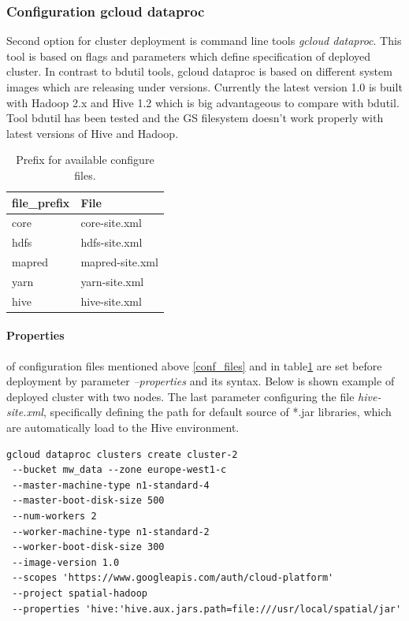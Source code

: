\documentclass[a4paper,12pt,oneside]{report}
\begin{document}
\subsubsection{Configuration gcloud dataproc}
Second option for cluster deployment is command line tools \textit{gcloud dataproc}. This tool is based on flags and parameters which define specification of deployed cluster. In contrast to bdutil tools, gcloud dataproc is based on different system images which are releasing under versions. Currently the latest version 1.0 is built with Hadoop 2.x and Hive 1.2 which is big advantageous to compare with bdutil. Tool bdutil has been tested and the GS filesystem doesn’t work properly with latest versions of Hive and Hadoop. 
\begin{table}[!htbp]
\centering
\begin{scriptsize}
\begin{tabular}{@{}|l|l|@{}}
\toprule 
file\_prefix & File            \\ \midrule \midrule
core         & core-site.xml   \\ \midrule
hdfs         & hdfs-site.xml   \\ \midrule
mapred       & mapred-site.xml \\ \midrule
yarn         & yarn-site.xml   \\ \midrule
hive         & hive-site.xml   \\ \bottomrule
\end{tabular}
\end{scriptsize}
\caption{Prefix for available configure files.}
\label{config_table}
\end{table}
\paragraph{Properties} of configuration files mentioned above \ref{conf_files} and in table\ref{config_table} are set before deployment by parameter \textit{--properties} and its syntax. Below is shown example of deployed cluster with two nodes. The last parameter configuring the file \textit{hive-site.xml},  specifically defining the path for default source of *.jar libraries, which are automatically load to the Hive environment. \cite{gcloud_dataproc}
\begin{footnotesize}
\begin{lstlisting}[style=python]
gcloud dataproc clusters create cluster-2 
 --bucket mw_data --zone europe-west1-c
 --master-machine-type n1-standard-4 
 --master-boot-disk-size 500 
 --num-workers 2
 --worker-machine-type n1-standard-2 
 --worker-boot-disk-size 300 
 --image-version 1.0 
 --scopes 'https://www.googleapis.com/auth/cloud-platform' 
 --project spatial-hadoop
 --properties 'hive:'hive.aux.jars.path=file:///usr/local/spatial/jar'
\end{lstlisting}
\end{footnotesize}
\end{document}
